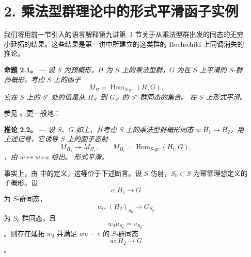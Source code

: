 
\section*{2. 乘法型群理论中的形式平滑函子实例}

我们将用前一节引入的语言解释第九讲第~3 节关于从乘法型群出发的同态的无穷小延拓的结果。这些结果是第一讲中所建立的这类群的 Hochschild 上同调消失的推论。

\medskip\noindent{}\textbf{命题 2.1。} --- \textit{设 \(S\) 为预概形，\(H\) 为 \(S\) 上的乘法型群，\(G\) 为在 \(S\) 上平滑的 \(S\)-群预概形。考虑 \(S\) 上的函子}  \[
  M_H=\operatorname{Hom}_{S\text{-}\mathrm{gr}}(H,G).
\]\textit{它在 \(S\) 上的 \(S'\) 处的值是从 \(H_{S'}\) 到 \(G_{S'}\) 的 \(S'\)-群同态的集合。 在 \(S\) 上形式平滑。}

参见 。更一般地：

\medskip\noindent{}\textbf{推论 2.2。} --- \textit{设 \(S\)、\(G\) 如上，并考虑 \(S\) 上的乘法型群概形同态 \(u:H_1\to H_2\)。用上述记号，它诱导 \(S\) 上的函子态射}  \[
  M_{H_2}\longrightarrow M_{H_1},
  \qquad
  M_{H_i}=\operatorname{Hom}_{S\text{-}\mathrm{gr}}(H_i,G),
\]\textit{，由 \(w\mapsto w\circ u\) 给出。 形式平滑。}

事实上，由  中的定义，这等价于下述断言。设 \(S\) 仿射，\(S_0\subset S\) 为幂零理想定义的子概形。设  \[
  v:H_1\longrightarrow G
\] 为 \(S\)-群同态， \[
  w_0:(H_2)_{S_0}\longrightarrow G_{S_0}
\] 为 \(S_0\)-群同态，且 \[
  w_0u_{S_0}=v_{S_0}.
\]。则存在延拓 \(w_0\) 并满足 \(wu=v\) 的 \(S\)-群同态  \[
  w:H_2\longrightarrow G
\]。

